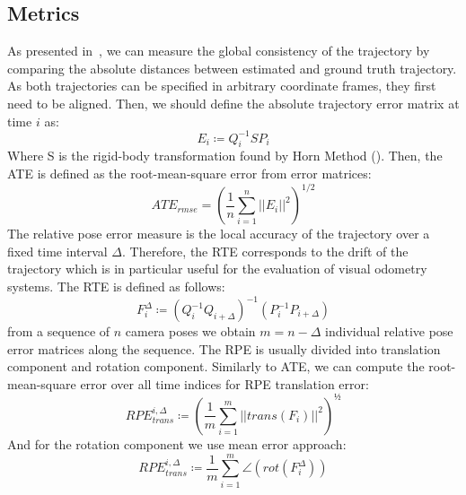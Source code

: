 \subsection{Metrics}\label{subsec:ate-and-rte}
As presented in~\cite{measuring_robustness_of_visual_slam}, we can measure the global consistency of the trajectory by comparing the absolute distances between estimated and ground truth trajectory.
As both trajectories can be specified in arbitrary coordinate frames, they first need to be aligned.
Then, we should define the absolute trajectory error matrix at time $i$ as:
\begin{equation}
    \label{eq:ate-error-matrix}
    E_i \coloneq Q_i^{-1} SP_i
\end{equation}
Where S is the rigid-body transformation found by Horn Method (\cite{horn_method}).
Then, the ATE is defined as the root-mean-square error from error matrices:
\begin{equation}
    ATE_{rmse} = (\frac{1}{n} \sum_{i=1}^{n} ||E_i||^2)^{1/2}
    \label{eq:ate-rmse}
\end{equation}
The relative pose error measure is the local accuracy of the trajectory over a fixed time interval $\Delta$.
Therefore, the RTE corresponds to the drift of the trajectory which is in particular useful for the evaluation of visual odometry systems.
The RTE is defined as follows:
\begin{equation}
    F_i^{\Delta} \coloneq (Q_i^{-1} Q_{i+\Delta})^{-1} (P_i^{-1} P_{i+\Delta})
    \label{eq:rte}
\end{equation}
from a sequence of $n$ camera poses we obtain  $m = n - \Delta$ individual relative pose error matrices along the sequence.
The RPE is usually divided into translation component and rotation component.
Similarly to ATE, we can compute the root-mean-square error over all time indices for RPE translation error:
\begin{equation}
    RPE_{trans}^{i, \Delta} \coloneq (\frac{1}{m} \sum_{i=1}^m ||trans(F_i)||^2)^{½}
    \label{eq:rpe-trans}
\end{equation}
And for the rotation component we use mean error approach:
\begin{equation}
    RPE_{trans}^{i, \Delta} \coloneq \frac{1}{m} \sum_{i=1}^m \angle (rot(F_i^\Delta))
    \label{eq:equation-rpe-trans}
\end{equation}